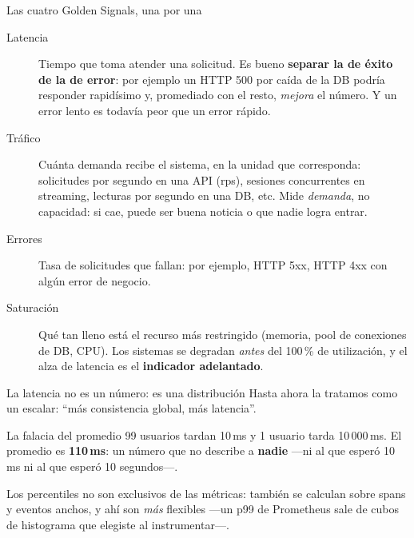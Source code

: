 \documentclass[institutional,screen,none]{../cls/ua-engineering-v6-beamer}
\begin{document}
\begin{frame}{Las cuatro Golden Signals, una por una}
\small
\begin{description}
\item[Latencia] Tiempo que toma atender una solicitud. Es bueno \textbf{separar la de éxito de la de error}: por ejemplo un HTTP 500 por caída de la DB podría responder rapidísimo y, promediado con el resto, \emph{mejora} el número. Y un error lento es todavía peor que un error rápido.
\pause
\item[Tráfico] Cuánta demanda recibe el sistema, en la unidad que corresponda: solicitudes por segundo en una API (rps), sesiones concurrentes en streaming, lecturas por segundo en una DB, etc. Mide \emph{demanda}, no capacidad: si cae, puede ser buena noticia o que nadie logra entrar.
\pause
\item[Errores] Tasa de solicitudes que fallan: por ejemplo, HTTP 5xx, HTTP 4xx con algún error de negocio.
\pause
\item[Saturación] Qué tan lleno está el recurso más restringido (memoria, pool de conexiones de DB, CPU). Los sistemas se degradan \emph{antes} del 100\,\% de utilización, y el alza de latencia es el \textbf{indicador adelantado}.
\end{description}

\end{frame}

\begin{frame}{La latencia no es un número: es una distribución}
Hasta ahora la tratamos como un escalar: ``más consistencia global, más latencia''.

\pause

\begin{alertblock}{La falacia del promedio}
99 usuarios tardan 10\,ms y 1 usuario tarda 10\,000\,ms. El promedio es \textbf{110\,ms}: un número que no describe a \textbf{nadie} ---ni al que esperó 10\,ms ni al que esperó 10 segundos---.
\end{alertblock}

\pause

{\small Los percentiles no son exclusivos de las métricas: también se calculan sobre spans y eventos anchos, y ahí son \emph{más} flexibles ---un p99 de Prometheus sale de cubos de histograma que elegiste al instrumentar---.}
\end{frame}
\end{document}
